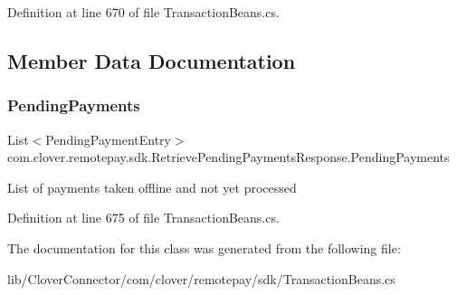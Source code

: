 Definition at line 670 of file Transaction\+Beans.\+cs.



\subsection{Member Data Documentation}
\mbox{\label{classcom_1_1clover_1_1remotepay_1_1sdk_1_1_retrieve_pending_payments_response_a71ad54fea229a5d583419a8d3db126f3}} 
\subsubsection{\texorpdfstring{Pending\+Payments}{PendingPayments}}
{\footnotesize\ttfamily List$<$Pending\+Payment\+Entry$>$ com.\+clover.\+remotepay.\+sdk.\+Retrieve\+Pending\+Payments\+Response.\+Pending\+Payments}



List of payments taken offline and not yet processed 



Definition at line 675 of file Transaction\+Beans.\+cs.



The documentation for this class was generated from the following file\+:\begin{DoxyCompactItemize}
\item 
lib/\+Clover\+Connector/com/clover/remotepay/sdk/Transaction\+Beans.\+cs\end{DoxyCompactItemize}
